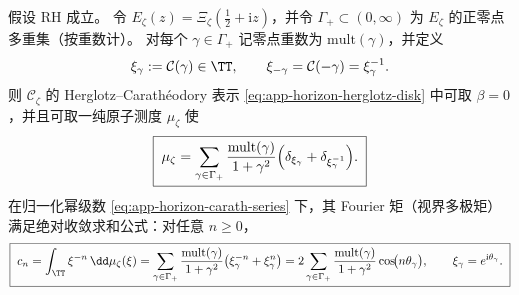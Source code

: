 \begin{theorem}[RH 假设下的视界谱测度原子化公式]\label{thm:app-horizon-spectral-measure-atomic}
假设 RH 成立。
令 \(E_{\zeta}(z)=\Xi_{\zeta}(\tfrac12+\mathrm{i}z)\)，并令 \(\Gamma_+\subset(0,\infty)\) 为 \(E_{\zeta}\) 的正零点多重集（按重数计）。
对每个 \(\gamma\in\Gamma_+\) 记零点重数为 \(\mathrm{mult}(\gamma)\)，并定义
\[
\xi_{\gamma}:=\mathcal{C}(\gamma)\in\TT,
\qquad
\xi_{-\gamma}=\mathcal{C}(-\gamma)=\xi_{\gamma}^{-1}.
\]
则 \(\mathscr{C}_{\zeta}\) 的 Herglotz--Carath\'eodory 表示 \eqref{eq:app-horizon-herglotz-disk} 中可取 \(\beta=0\)，并且可取一纯原子测度 \(\mu_{\zeta}\) 使
\begin{equation}\label{eq:app-horizon-mu-atomic}
\boxed{\;
\mu_{\zeta}
=
\sum_{\gamma\in\Gamma_+}\frac{\mathrm{mult}(\gamma)}{1+\gamma^2}\Bigl(\delta_{\xi_{\gamma}}+\delta_{\xi_{\gamma}^{-1}}\Bigr).
\;}
\end{equation}
在归一化幂级数 \eqref{eq:app-horizon-carath-series} 下，其 Fourier 矩（视界多极矩）满足绝对收敛求和公式：对任意 \(n\ge 0\)，
\begin{equation}\label{eq:app-horizon-moment-sum}
\boxed{\;
c_n=\int_{\TT}\xi^{-n}\,\dd\mu_{\zeta}(\xi)
=
\sum_{\gamma\in\Gamma_+}\frac{\mathrm{mult}(\gamma)}{1+\gamma^2}\bigl(\xi_{\gamma}^{-n}+\xi_{\gamma}^{n}\bigr)
=
2\sum_{\gamma\in\Gamma_+}\frac{\mathrm{mult}(\gamma)}{1+\gamma^2}\cos\!\bigl(n\theta_{\gamma}\bigr),
\qquad \xi_{\gamma}=e^{\mathrm{i}\theta_{\gamma}}.
\;}
\end{equation}
\end{theorem}

